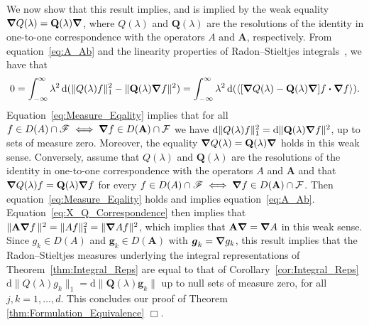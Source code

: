 \documentclass[leqno,onefignum,onetabnum]{siamltex1213}
\newcommand{\thmref}[1]{Theorem~\ref{#1}}
\newcommand{\corref}[1]{Corollary~\ref{#1}}
\renewcommand{\d}{\mathrm{d}}
\newcommand{\Ab}{\mathbf{A}}
\newcommand{\Qb}{\mathbf{Q}}
\newcommand{\Fc}{\mathcal{F}}
\newcommand{\Fs}{\mathscr{F}}
\newcommand\bnabla{\mbox{\boldmath${\nabla}$}}
\providecommand\bcdot{\boldsymbol{\cdot}}
\newcommand{\vecg}{\boldsymbol{g}}
\begin{document}
We now show that this result implies, and is implied by the weak
equality $\bnabla Q(\lambda)=\Qb(\lambda)\bnabla $, where
$Q(\lambda)$ and $\Qb(\lambda)$ are the resolutions of the identity in one-to-one
correspondence with the operators $A$ and $\Ab$, respectively. From
equation~\eqref{eq:A_Ab} and the linearity properties of
Radon--Stieltjes integrals~\cite{Stone:64}, we have that   
%
\begin{align}\label{eq:Measure_Eqality}
  0=\int_{-\infty}^\infty\lambda^2\,\d(\|Q(\lambda)f\|_1^2-\|\Qb(\lambda)\bnabla f\|^2)
   =\int_{-\infty}^\infty\lambda^2\,\d(\langle[\bnabla Q(\lambda)-\Qb(\lambda)\bnabla ]f\bcdot\bnabla f\rangle).
\end{align}
%
Equation~\eqref{eq:Measure_Eqality} implies that for all
$f\in D(A)\cap\Fs\iff\bnabla f\in D(\Ab)\cap\Fc$ we have
$\d\|Q(\lambda)f\|_1^2=\d\|\Qb(\lambda)\bnabla f\|^2$, up to sets of measure
zero. Moreover, the equality $\bnabla Q(\lambda)=\Qb(\lambda)\bnabla $ holds
in this weak sense. Conversely, assume that $Q(\lambda)$ and 
$\Qb(\lambda)$ are the resolutions of the identity in one-to-one
correspondence with the operators $A$ and $\Ab$ and that $\bnabla
Q(\lambda)f=\Qb(\lambda)\bnabla f$ for every $f\in D(A)\cap\Fs\iff\bnabla f\in D(\Ab)\cap\Fc$. Then
equation~\eqref{eq:Measure_Eqality} holds and implies
equation~\eqref{eq:A_Ab}. Equation~\eqref{eq:X_Q_Correspondence} then
implies that $\|\Ab\bnabla f\,\|^2=\|Af\|_1^2=\|\bnabla Af\|^2$, which
implies that $\Ab\bnabla =\bnabla A$ in this weak sense. Since 
$g_k\in D(A)$ and $\vecg_k\in D(\Ab)$ with $\vecg_k=\bnabla g_k$, this result implies
that the Radon--Stieltjes measures underlying the integral
representations of \thmref{thm:Integral_Reps} are equal to that of
\corref{cor:Integral_Reps} $\d\| Q(\lambda)g_k\|_1=\d\|\Qb(\lambda)\vecg_k\|$ up to
null sets of measure zero, for all $j,k=1,\ldots,d$. This concludes our
proof of Theorem \ref{thm:Formulation_Equivalence} $\Box$.     
\end{document}
